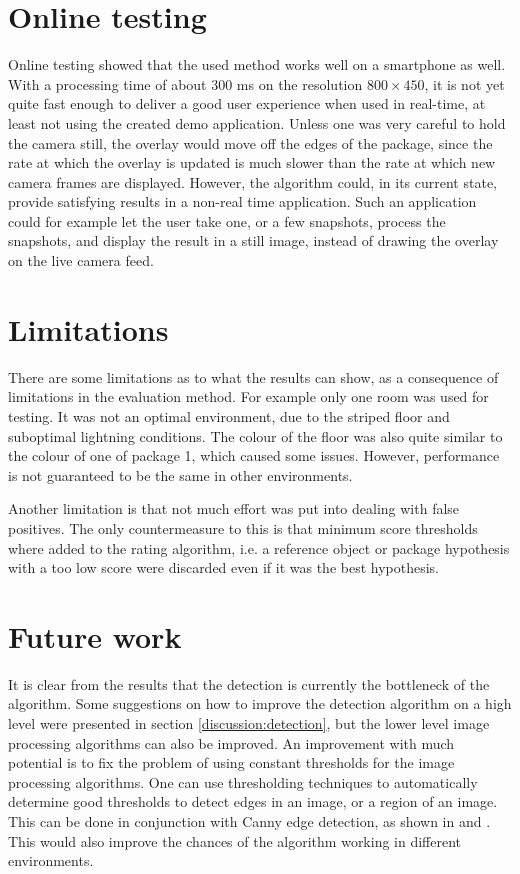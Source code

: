 \section{Online testing} %
Online testing showed that the used method works well on a smartphone as well.
With a processing time of about 300 ms on the resolution $800 \times 450$, it is not yet quite fast enough to deliver a good user experience when used in real-time, at least not using the created demo application.
Unless one was very careful to hold the camera still, the overlay would move off the edges of the package, since the rate at which the overlay is updated is much slower than the rate at which new camera frames are displayed.
However, the algorithm could, in its current state, provide satisfying results in a non-real time application.
Such an application could for example let the user take one, or a few snapshots, process the snapshots, and display the result in a still image, instead of drawing the overlay on the live camera feed.

\section{Limitations}									
There are some limitations as to what the results can show, as a consequence of limitations in the evaluation method.
For example only one room was used for testing.
It was not an optimal environment, due to the striped floor and suboptimal lightning conditions.
The colour of the floor was also quite similar to the colour of one of package 1, which caused some issues.
However, performance is not guaranteed to be the same in other environments.

Another limitation is that not much effort was put into dealing with false positives.
The only countermeasure to this is that minimum score thresholds where added to the rating algorithm, i.e. a reference object or package hypothesis with a too low score were discarded even if it was the best hypothesis.

\section{Future work} \label{discussion:future_work}
It is clear from the results that the detection is currently the bottleneck of the algorithm.
Some suggestions on how to improve the detection algorithm on a high level were presented in section \ref{discussion:detection}, but the lower level image processing algorithms can also be improved.
An improvement with much potential is to fix the problem of using constant thresholds for the image processing algorithms.
One can use thresholding techniques to automatically determine good thresholds to detect edges in an image, or a region of an image.
This can be done in conjunction with Canny edge detection, as shown in \cite{wang2005fast} and \cite{liu2004automated}.
This would also improve the chances of the algorithm working in different environments.

